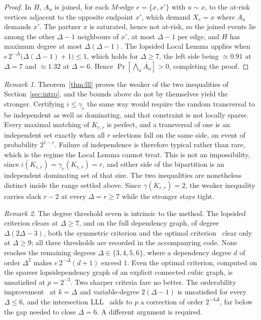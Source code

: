\documentclass[11pt]{article}
\theoremstyle{definition}
\theoremstyle{remark}
\newtheorem{remark}{Remark}
\newcommand{\edom}{\gamma_{e}}
\newcommand{\ind}{i}
\begin{document}
\begin{proof}
\medskip\noindent
In $H$, $A_u$ is joined, for each $M$-edge $e = \{x,x'\}$ with
$u \sim x$, to the at-risk vertices adjacent to the opposite endpoint $x'$, which
demand $X_e = x$ where $A_u$ demands $x'$. The partner $x$ is saturated, hence
not at-risk, so the joined events lie among the other $\Delta - 1$ neighbours of
$x'$, at most $\Delta - 1$ per edge, and $H$
has maximum degree at most $\Delta(\Delta-1)$. The lopsided
Local Lemma applies when $e\,2^{-\Delta}\bigl(\Delta(\Delta-1)+1\bigr) \le 1$,
which holds for $\Delta \ge 7$, the left side being $\approx 0.91$ at
$\Delta = 7$ and $\approx 1.32$ at $\Delta = 6$. Hence
$\Pr[\bigwedge_u \overline{A_u}] > 0$, completing the proof.
\end{proof}

\begin{remark}
Theorem~\ref{thm:lll} proves the weaker of the two inequalities of
Section~\ref{sec:intro}, and the bounds above do not by themselves yield the
stronger. Certifying $\ind \le \edom$ the same way would require the random
transversal to be independent as well as dominating, and that constraint is not
locally sparse. Every maximal matching of $K_{r,r}$ is perfect, and a transversal
of one is an independent set exactly when all $r$ selections fall on the same
side, an event of probability $2^{1-r}$. Failure of independence is therefore
typical rather than rare, which is the regime the Local Lemma cannot treat. This
is not an impossibility, since $\ind(K_{r,r}) = \edom(K_{r,r}) = r$, and either side of
the bipartition is an independent dominating set of that size. The two
inequalities are nonetheless distinct inside the range settled above. Since
$\gamma(K_{r,r}) = 2$, the weaker inequality carries slack $r - 2$ at every
$\Delta = r \ge 7$ while the stronger stays tight.
\end{remark}

\begin{remark}
The degree threshold seven is intrinsic to the method. The lopsided criterion
clears at $\Delta \ge 7$, and on the full dependency graph, of
degree $\Delta(2\Delta-3)$, both the symmetric criterion and the optimal
criterion~\cite{Shearer1985} clear only at $\Delta \ge 9$; all three thresholds
are recorded in the accompanying code. None reaches the remaining degrees
$\Delta \in \{3,4,5,6\}$, where a dependency degree $d$ of order $\Delta^2$ makes
$e\,2^{-\Delta}(d+1)$ exceed $1$. Even the optimal criterion, computed on the
sparser lopsidependency graph of an explicit connected cubic graph, is
unsatisfied at $p = 2^{-3}$. Two sharper criteria fare no better. The
orderability improvement~\cite{Harris2016} at $k = \Delta$ and variable-degree
$2(\Delta-1)$ is unsatisfied for every $\Delta \le 6$, and the intersection
LLL~\cite{HeLiSun2023} adds to $p$ a correction of order $2^{-4\Delta}$, far
below the gap needed to close $\Delta = 6$. A different argument is required.
\end{remark}
\end{document}
